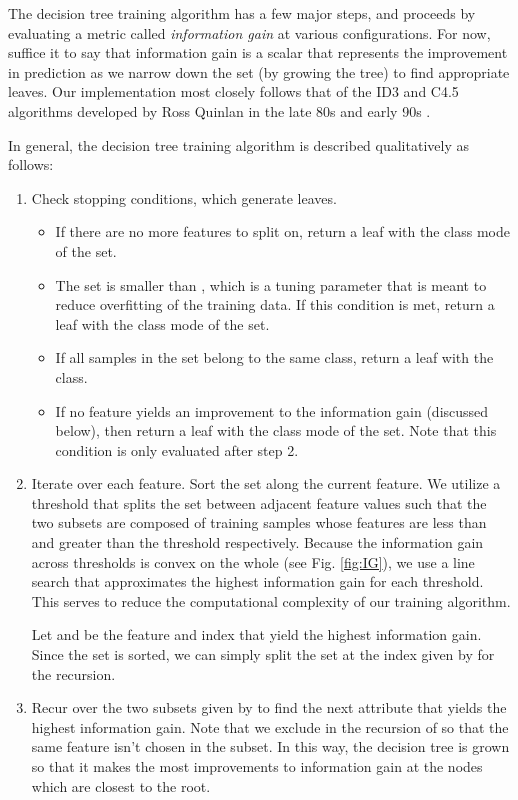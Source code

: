 The decision tree training algorithm has a few major steps, and proceeds by evaluating a metric called \emph{information gain} at various configurations. For now, suffice it to say that information gain is a scalar that represents the improvement in prediction as we narrow down the set (by growing the tree) to find appropriate leaves. Our implementation most closely follows that of the ID3 and C4.5 algorithms developed by Ross Quinlan in the late 80s and early 90s \cite{wiki:id3} \cite{wiki:c45}.

In general, the decision tree training algorithm is described qualitatively as follows:
%
\begin{enumerate}
\item Check stopping conditions, which generate leaves.
%
  \begin{itemize}
  \item If there are no more features to split on, return a leaf with the class mode of the set. 
  \item The set is smaller than , which is a tuning parameter that is meant to reduce overfitting of the training data. If this condition is met, return a leaf with the class mode of the set.
  \item If all samples in the set belong to the same class, return a leaf with the class.
  \item If no feature yields an improvement to the information gain (discussed below), then return a leaf with the class mode of the set. Note that this condition is only evaluated after step 2. 
  \end{itemize}
\item Iterate over each feature. Sort the set along the current feature. We utilize a threshold that splits the set between adjacent feature values such that the two subsets are composed of training samples whose features are less than and greater than the threshold respectively. Because the information gain across thresholds is convex on the whole (see Fig. \ref{fig:IG}), we use a line search that approximates the highest information gain for each threshold. This serves to reduce the computational complexity of our training algorithm.

  Let  and  be the feature and index that yield the highest information gain. Since the set is sorted, we can simply split the set at the index given by  for the recursion.
\item Recur over the two subsets given by  to find the next attribute that yields the highest information gain. Note that we exclude  in the recursion of  so that the same feature isn't chosen in the subset. In this way, the decision tree is grown so that it makes the most improvements to information gain at the nodes which are closest to the root.  
\end{enumerate}

